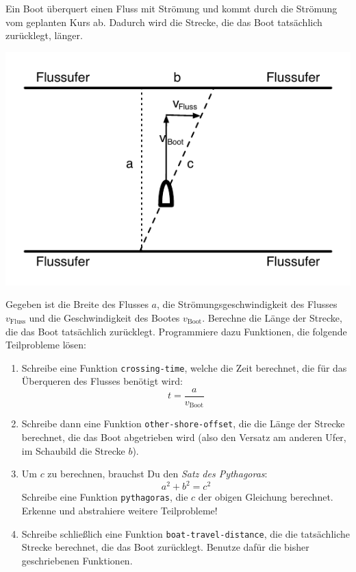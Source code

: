 \begin{aufgabe}

 Ein Boot überquert einen Fluss mit Strömung und
  kommt durch die Strömung vom geplanten Kurs ab.  Dadurch wird die
  Strecke, die das Boot tatsächlich zurücklegt, länger.

  \begin{center}
    \includegraphics{riverboat}
  \end{center}

  Gegeben ist die Breite des Flusses $a$, die Strömungsgeschwindigkeit
  des Flusses $v_{\text{Fluss}}$ und die Geschwindigkeit des Bootes
  $v_{\text{Boot}}$.  Berechne die Länge der Strecke, die das
  Boot tatsächlich zurücklegt.  Programmiere dazu Funktionen, die
  folgende Teilprobleme lösen:

  \begin{enumerate}
  \item Schreibe eine Funktion \lstinline{crossing-time}, welche die
    Zeit berechnet, die für das Überqueren des Flusses benötigt wird:
    \[t = \frac{a}{v_{\text{Boot}}}\]
  \item Schreibe dann eine Funktion \texttt{other-shore-offset},
    die die Länge der Strecke berechnet, die das Boot abgetrieben wird
    (also den Versatz am anderen Ufer, im Schaubild die Strecke $b$).

  \item Um $c$ zu berechnen, brauchst Du den \textit{Satz des
      Pythagoras}:
    \begin{displaymath}
      a^2 + b^2 = c^2
    \end{displaymath}
    Schreibe eine Funktion \texttt{pythagoras}, die $c$ der
    obigen Gleichung berechnet.  Erkenne und abstrahiere weitere
    Teilprobleme!

  \item Schreibe schließlich eine Funktion
    \texttt{boat-travel-distance}, die die tatsächliche Strecke
    berechnet, die das Boot zurücklegt.  Benutze dafür die bisher
    geschriebenen Funktionen.
  \end{enumerate}
\end{aufgabe}


